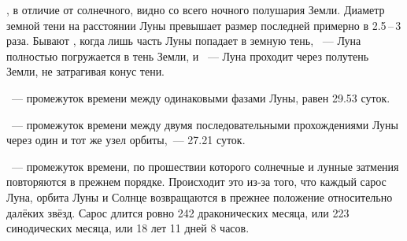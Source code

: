, в отличие от солнечного, видно со всего ночного полушария Земли. Диаметр земной тени на расстоянии Луны превышает размер последней примерно в 2.5\,--\,3 раза. Бывают , когда лишь часть Луны попадает в земную тень, ~--- Луна полностью погружается в тень Земли, и ~--- Луна проходит через полутень Земли, не затрагивая конус тени.

~--- промежуток времени между одинаковыми фазами Луны, равен 29.53 суток.

~--- промежуток времени между двумя последовательными прохождениями Луны через один и тот же узел орбиты,~--- 27.21 суток.

~--- промежуток  времени, по прошествии которого солнечные и лунные затмения повторяются в прежнем порядке. Происходит это из-за того, что каждый сарос Луна, орбита Луны и Солнце возвращаются в прежнее положение относительно далёких звёзд. Сарос длится ровно 242 драконических месяца, или 223 синодических месяца, или 18 лет 11 дней 8 часов.


